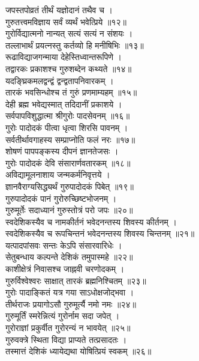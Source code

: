 जपस्तपोव्रतं तीर्थं यज्ञोदानं तथैव च ।\\
गुरुतत्त्वमविज्ञाय सर्वं व्यर्थं भवेत्प्रिये ॥१२॥\\
गुरोर्विद्यात्मनो नान्यत् सत्यं सत्यं न संशयः ।\\
तल्लाभार्थं प्रयत्नस्तु कर्तव्यो हि मनीषिभिः ॥१३॥\\
रूढाविद्याजगन्माया देहेस्तिध्वान्तरूपिणे ।\\
तद्वारकः प्रकाशश्च गुरुशब्देन कथ्यते ॥१४॥\\
यदङ्घ्रिकमलद्वन्द्वं द्वन्द्वतापनिवारकम् ।\\
तारकं भवसिन्धोश्च तं गुरुं प्रणमाम्यहम् ॥१५॥\\
देही ब्रह्म भवेद्यस्मात् तदिदानीं प्रकाशये ।\\
सर्वपापविशुद्धात्मा श्रीगुरोः पादसेवनम् ॥१६॥\\
गुरोः पादोदकं पीत्वा धृत्वा शिरसि पावनम् ।\\
सर्वतीर्थावगाहस्य सम्प्राप्नोति फलं नरः ॥१७॥\\
शोषणं पापपङ्कस्य दीपनं ज्ञानतेजसः ।\\
गुरोः पादोदकं देवि संसारार्णवतारकम् ॥१८॥\\
अविद्यामूलनाशाय जन्मकर्मनिवृत्तये ।\\
ज्ञानवैराग्यसिद्ध्यर्थं गुरुपादोदकं पिबेत् ॥१९॥\\
गुरुपादोदकं पानं गुरोरुच्छिष्टभोजनम् ।\\
गुरुमूर्तेः सदाध्यानं गुरुस्तोत्रं परो जपः ॥२०॥\\
स्वदेशिकस्यैव च नामकीर्तनं भवेदनन्तस्य शिवस्य कीर्तनम् ।\\
स्वदेशिकस्यैव च रूपचिन्तनं भवेदनन्तस्य शिवस्य चिन्तनम् ॥२१॥\\
यत्पादपांसवः सन्तः केऽपि संसारवारिधेः ।\\
सेतुबन्धाय कल्पन्ते देशिकं तमुपास्महे ॥२२॥\\
काशीक्षेत्रं निवासश्च जाह्नवी चरणोदकम् ।\\
गुरुर्विश्वेश्वरः साक्षात् तारकं ब्रह्मनिश्चितम् ॥२३॥\\
गुरोः पादाङ्कितं यत्र गया साऽधोक्षजोद्भवा ।\\
तीर्थराजः प्रयागोऽसौ गुरुमूर्त्यै नमो नमः ॥२४॥\\
गुरुमूर्तिं स्मरेन्नित्यं गुरोर्नाम सदा जपेत् ।\\
गुरोराज्ञां प्रकुर्वीत गुरोरन्यं न भावयेत् ॥२५॥\\
गुरुवक्त्रे स्थिता  विद्या प्राप्यते तत्प्रसादतः ।\\
तस्मात्तं देशिकं ध्यायेद्यथा योषित्प्रियं स्वकम् ॥२६॥\\
